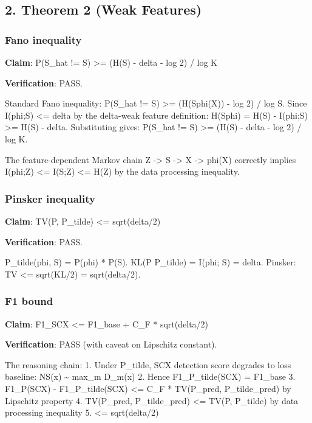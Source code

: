 \documentclass[
  12pt,
]{article}
\begin{document}
\subsection{2. Theorem 2 (Weak Features)}\label{theorem-2-weak-features}

\subsubsection{Fano inequality}\label{fano-inequality}

\textbf{Claim}: P(S\_hat != S) \textgreater= (H(S) - delta - log 2) /
log K

\textbf{Verification}: PASS.

Standard Fano inequality: P(S\_hat != S) \textgreater=
(H(S\textbar phi(X)) - log 2) / log \textbar S\textbar. Since I(phi;S)
\textless= delta by the delta-weak feature definition: H(S\textbar phi)
= H(S) - I(phi;S) \textgreater= H(S) - delta. Substituting gives:
P(S\_hat != S) \textgreater= (H(S) - delta - log 2) / log K.

The feature-dependent Markov chain Z -\textgreater{} S -\textgreater{} X
-\textgreater{} phi(X) correctly implies I(phi;Z) \textless= I(S;Z)
\textless= H(Z) by the data processing inequality.

\subsubsection{Pinsker inequality}\label{pinsker-inequality}

\textbf{Claim}: TV(P, P\_tilde) \textless= sqrt(delta/2)

\textbf{Verification}: PASS.

P\_tilde(phi, S) = P(phi) * P(S). KL(P \textbar\textbar{} P\_tilde) =
I(phi; S) = delta. Pinsker: TV \textless= sqrt(KL/2) = sqrt(delta/2).

\subsubsection{F1 bound}\label{f1-bound-1}

\textbf{Claim}: F1\_SCX \textless= F1\_base + C\_F * sqrt(delta/2)

\textbf{Verification}: PASS (with caveat on Lipschitz constant).

The reasoning chain: 1. Under P\_tilde, SCX detection score degrades to
loss baseline: NS(x) \textasciitilde{} max\_m D\_m(x) 2. Hence
F1\_P\_tilde(SCX) = F1\_base 3. \textbar F1\_P(SCX) -
F1\_P\_tilde(SCX)\textbar{} \textless= C\_F * TV(P\_pred,
P\_tilde\_pred) by Lipschitz property 4. TV(P\_pred, P\_tilde\_pred)
\textless= TV(P, P\_tilde) by data processing inequality 5. \textless=
sqrt(delta/2)
\end{document}

